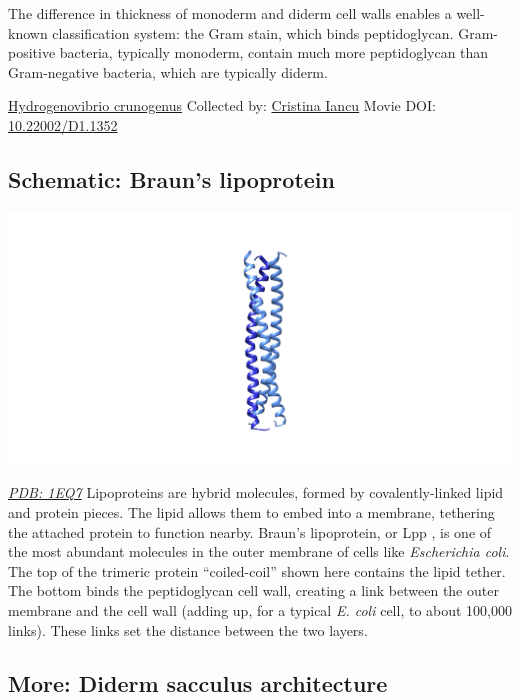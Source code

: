 \documentclass[]{tufte-book}
\begin{document}
The difference in thickness of monoderm and diderm cell walls enables a well-known classification system: the Gram stain, which binds peptidoglycan. Gram-positive bacteria, typically monoderm, contain much more peptidoglycan than Gram-negative bacteria, which are typically diderm.



\hypertarget{htmlwidget-405d050c44e9945adfea}{}

\label{fig:2-3}\protect\hyperlink{tree}{Hydrogenovibrio crunogenus} Collected by: \protect\hyperlink{cristina_iancu}{Cristina Iancu} Movie DOI: \href{https://doi.org/10.22002/D1.1352}{10.22002/D1.1352}

\hypertarget{Brauns_lipoprotein}{%
\subsection*{Schematic: Braun's lipoprotein}\label{Brauns_lipoprotein}}

\includegraphics{img/schematics/2_3_1}

\href{http://rcsb.org/structure/1EQ7}{\emph{PDB: 1EQ7}}
Lipoproteins are hybrid molecules, formed by covalently-linked lipid and protein pieces. The lipid allows them to embed into a membrane, tethering the attached protein to function nearby. Braun's lipoprotein, or Lpp \citep{shu2000}, is one of the most abundant molecules in the outer membrane of cells like \emph{Escherichia coli}. The top of the trimeric protein ``coiled-coil'' shown here contains the lipid tether. The bottom binds the peptidoglycan cell wall, creating a link between the outer membrane and the cell wall (adding up, for a typical \emph{E. coli} cell, to about 100,000 links). These links set the distance between the two layers.

\hypertarget{Diderm_sacculus_architecture}{%
\subsection*{More: Diderm sacculus architecture}\label{Diderm_sacculus_architecture}}
\end{document}
